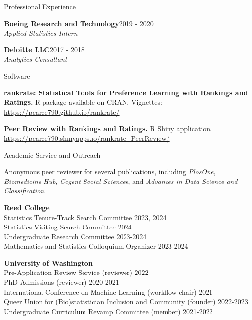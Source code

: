 \documentclass{resume} %
\begin{document}
\begin{rSection}{Professional Experience}

\textbf{Boeing Research and Technology}\hfill{2019 - 2020}
\\{\it Applied Statistics Intern}

\textbf{Deloitte LLC}\hfill{2017 - 2018}
\\{\it Analytics Consultant}

\end{rSection}

\begin{rSection}{Software}

\textbf{rankrate: Statistical Tools for Preference Learning with Rankings and Ratings.} R package available on CRAN. Vignettes: \url{https://pearce790.github.io/rankrate/} 

\textbf{Peer Review with Rankings and Ratings.} R Shiny application. \url{https://pearce790.shinyapps.io/rankrate_PeerReview/}

\end{rSection}



\begin{rSection}{Academic Service and Outreach}

Anonymous peer reviewer for several publications, including \textit{PlosOne}, \textit{Biomedicine Hub}, \textit{Cogent Social Sciences}, and \textit{Advances in Data Science and Classification}.

\textbf{Reed College}
\\ Statistics Tenure-Track Search Committee \hfill{2023, 2024}
\\ Statistics Visiting Search Committee \hfill{2024}
\\ Undergraduate Research Committee \hfill{2023-2024}
\\ Mathematics and Statistics Colloquium Organizer \hfill{2023-2024}

\textbf{University of Washington}
\\ Pre-Application Review Service (reviewer) \hfill{2022}
\\ PhD Admissions (reviewer) \hfill{2020-2021}
\\ International Conference on Machine Learning (workflow chair) \hfill{2021}
\\ Queer Union for (Bio)statistician Inclusion and Community (founder) \hfill{2022-2023}
\\ Undergraduate Curriculum Revamp Committee (member) \hfill {2021-2022}

\end{rSection}
\end{document}
